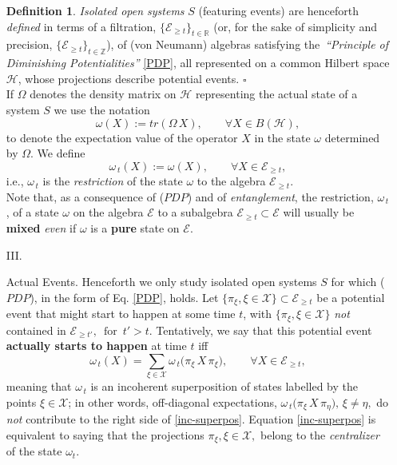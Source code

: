 \documentclass[12pt]{article}
\begin{document}
\begin{enumerate}
{{\bf{Definition 1}}. \textit{Isolated open systems} $S$ (featuring events) are henceforth \textit{defined} in terms of a filtration, $\lbrace \mathcal{E}_{\geq t} \rbrace_{t \in \mathbb{R}}$ (or, for the sake of simplicity and precision, $\lbrace \mathcal{E}_{\geq t} \rbrace_{t \in \mathbb{Z}}$), of (von Neumann) algebras satisfying the \,\textit{``Principle of Diminishing Potentialities''} \eqref{PDP}, all represented on a common Hilbert space $\mathcal{H}$, whose projections describe potential events. \hspace{4.5cm} $\square$\\

If $\Omega$ denotes the density matrix on $\mathcal{H}$ representing the actual state of a system $S$ we use the notation
$$\omega(X):= tr(\Omega\,X), \qquad \forall X \in B(\mathcal{H}),$$
to denote the expectation value of the operator $X$ in the state $\omega$ determined by $\Omega$. We define
\begin{equation}\label{state-rest}
\omega_{\,t}(X):= \omega(X), \qquad \forall X \in \mathcal{E}_{\geq t},
\end{equation}
i.e., $\omega_{\,t}$ is the \textit{restriction} of the state $\omega$ to the algebra $\mathcal{E}_{\geq t}$.\\
Note that, as a consequence of ($PDP$) and of \textit{entanglement}, the restriction, $\omega_{\,t}$, of a state $\omega$ on the algebra
$\mathcal{E}$ to a subalgebra $\mathcal{E}_{\geq t} \subset \mathcal{E}$ will usually be {\bf{mixed}} \textit{even} if $\omega$ is a {\bf{pure}} state on $\mathcal{E}$.
}\\

\item[III.]{{Actual Events}. 
Henceforth we only study isolated open systems $S$ for which ($PDP$), in the form of Eq. \eqref{PDP}, holds. Let \mbox{$\lbrace \pi_{\xi}, \xi \in \mathcal{X} \rbrace \subset \mathcal{E}_{\geq t}$} be a potential event that might start to happen at some time $t$, with  \mbox{$\lbrace \pi_{\xi}, \xi \in \mathcal{X} \rbrace$} \textit{not} contained in $\mathcal{E}_{\geq t'}, \,\text{  for   }\, t'>t$. Tentatively, we say that this potential event {\bf{actually starts to happen}} at time $t$ iff
\begin{equation}\label{inc-superpos}
\omega_{\,t}(X)=\sum_{\xi \in \mathcal{X}} \omega_{\,t}\big( \pi_{\xi} \,X\, \pi_{\xi} \big), \qquad \forall X \in \mathcal{E}_{\geq t},
\end{equation}
meaning that $\omega_{\,t}$ is an incoherent superposition of states labelled by the points $\xi \in \mathcal{X}$; in other words, off-diagonal expectations, 
$\omega_{\,t}\big( \pi_{\xi}\,X\, \pi_{\eta} \big), \, \xi \not= \eta,$ do \textit{not} contribute to the right side of \eqref{inc-superpos}.
Equation \eqref{inc-superpos} is equivalent to saying that the projections $\pi_{\xi}, \xi \in \mathcal{X},$ belong to the \textit{centralizer} of the state $\omega_t$.

}
\end{enumerate}
\end{document}
